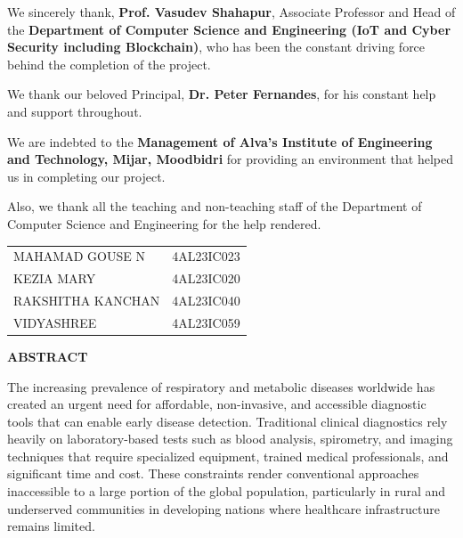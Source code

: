 \documentclass[12pt,a4paper]{report}
\begin{document}
\vspace{0.5cm}
We sincerely thank, \textbf{Prof. Vasudev Shahapur}, Associate Professor and Head of the \textbf{Department of Computer Science and Engineering (IoT and Cyber Security including Blockchain)}, who has been the constant driving force behind the completion of the project.

\vspace{0.5cm}
We thank our beloved Principal, \textbf{Dr. Peter Fernandes}, for his constant help and support throughout.

\vspace{0.5cm}
We are indebted to the \textbf{Management of Alva's Institute of Engineering and Technology, Mijar, Moodbidri} for providing an environment that helped us in completing our project.

\vspace{0.5cm}
Also, we thank all the teaching and non-teaching staff of the Department of Computer Science and Engineering for the help rendered.

\vspace{2cm}
\begin{center}
\begin{tabular}{l r}
MAHAMAD GOUSE N & 4AL23IC023 \\
KEZIA MARY & 4AL23IC020 \\
RAKSHITHA KANCHAN & 4AL23IC040 \\
VIDYASHREE & 4AL23IC059 \\
\end{tabular}
\end{center}
\newpage

\thispagestyle{empty}
\begin{center}
\textbf{\Large ABSTRACT}\\[0.5cm]
\end{center}

The increasing prevalence of respiratory and metabolic diseases worldwide has created an urgent need for affordable, non-invasive, and accessible diagnostic tools that can enable early disease detection. Traditional clinical diagnostics rely heavily on laboratory-based tests such as blood analysis, spirometry, and imaging techniques that require specialized equipment, trained medical professionals, and significant time and cost. These constraints render conventional approaches inaccessible to a large portion of the global population, particularly in rural and underserved communities in developing nations where healthcare infrastructure remains limited.
\end{document}
